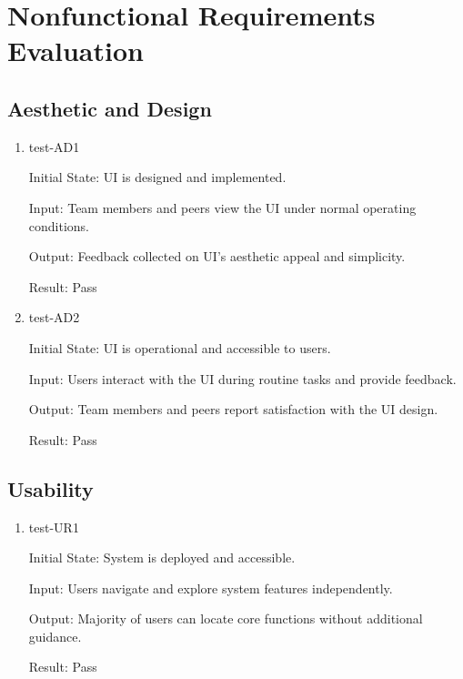 \documentclass[12pt, titlepage]{article}
\begin{document}
\section{Nonfunctional Requirements Evaluation} \label{section:4}

\subsection{Aesthetic and Design} \label{section:4.1}

\begin{enumerate}

  \item {test-AD1} \label{test-AD1}

  Initial State: UI is designed and implemented.

  Input: Team members and peers view the UI under normal operating conditions.

  Output: Feedback collected on UI’s aesthetic appeal and simplicity.

  Result: Pass

  \item {test-AD2} \label{test-AD2}

  Initial State: UI is operational and accessible to users.

  Input: Users interact with the UI during routine tasks and provide feedback.

  Output: Team members and peers report satisfaction with the UI design.

  Result: Pass

\end{enumerate}

\subsection{Usability} \label{section:4.2}

\begin{enumerate}

  \item {test-UR1} \label{test-UR1}

  Initial State: System is deployed and accessible.

  Input: Users navigate and explore system features independently.

  Output: Majority of users can locate core functions without additional guidance.

  Result: Pass

\end{enumerate}
\end{document}
